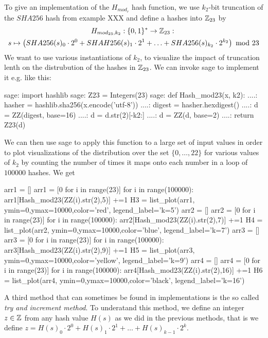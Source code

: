 \begin{example} To give an implementation of the $H_{mod_r}$ hash function, we use  $k_2$-bit truncation of the $SHA256$ hash from example XXX and define a hashes into $\mathbb{Z}_{23}$ by
\begin{multline*}
H_{mod_{23},k_2}: \{0,1\}^* \to \mathbb{Z}_{23}:\; \\
s\mapsto
\left(SHA256(s)_0\cdot 2^0 + SHAH256(s)_1\cdot 2^1 + \ldots + SHA256(s)_{k_2}\cdot 2^{k_2}\right) \text{ mod } 23 
\end{multline*}
We want to use various instantiations of $k_2$, to visualize the impact of truncation lenth on the distrubution of the hashes in $\mathbb{Z}_{23}$. We can invoke sage to implement it e.g. like this:
\begin{sagecommandline}
sage: import hashlib 
sage: Z23 = Integers(23)
sage: def Hash_mod23(x, k2):
....:     hasher = hashlib.sha256(x.encode('utf-8'))
....:     digest = hasher.hexdigest()
....:     d = ZZ(digest, base=16)
....:     d = d.str(2)[-k2:]
....:     d = ZZ(d, base=2)
....:     return Z23(d)
\end{sagecommandline}
We can then use sage to apply this function to a large set of input values in order to plot visualizations of the distribution over the set $\{0,\ldots,22\}$ for various values of $k_2$ by counting the number of times it maps onto each number in a loop of $100000$ hashes. We get
\begin{sagesilent}
arr1 = []
arr1 = [0 for i in range(23)]
for i in range(100000):
    arr1[Hash_mod23(ZZ(i).str(2),5)] +=1
H3 = list_plot(arr1, ymin=0,ymax=10000,color='red', legend_label='k=5')
arr2 = []
arr2 = [0 for i in range(23)]
for i in range(100000):
    arr2[Hash_mod23(ZZ(i).str(2),7)] +=1
H4 = list_plot(arr2, ymin=0,ymax=10000,color='blue', legend_label='k=7')
arr3 = []
arr3 = [0 for i in range(23)]
for i in range(100000):
    arr3[Hash_mod23(ZZ(i).str(2),9)] +=1
H5 = list_plot(arr3, ymin=0,ymax=10000,color='yellow', legend_label='k=9')
arr4 = []
arr4 = [0 for i in range(23)]
for i in range(100000):
    arr4[Hash_mod23(ZZ(i).str(2),16)] +=1
H6 = list_plot(arr4, ymin=0,ymax=10000,color='black', legend_label='k=16')
\end{sagesilent}
\begin{center} 
\end{center}
\end{example}
A third method that can sometimes be found in implementations is the so called \textit{try and increment method}. To underatand this method, we define an integer $z\in\mathbb{Z}$ from any hash value $H(s)$ as we did in the previous methods, that is we define $z = H(s)_0\cdot 2^0 + H(s)_1\cdot 2^1 + \ldots + H(s)_{k-1}\cdot 2^{k}$. 

